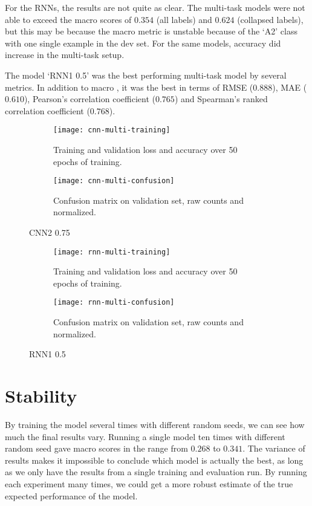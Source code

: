 For the RNNs, the results are not quite as clear. The multi-task models were
not able to exceed the macro \FI scores of $0.354$ (all labels) and $0.624$
(collapsed labels), but this may be because the macro \FI metric is unstable
because of the `A2' class with one single example in the dev set. For the
same models, accuracy did increase in the multi-task setup.

The model `RNN1 0.5' was the best performing multi-task model by several
metrics. In addition to macro \FI, it was the best in terms of RMSE
($0.888$), MAE ($0.610$), Pearson's correlation coefficient ($0.765$) and
Spearman's ranked correlation coefficient ($0.768$).


\begin{figure}
  \begin{subfigure}{\linewidth}
    \centering
    \texttt{[image: cnn-multi-training]}
    \caption{Training and validation loss and accuracy over 50 epochs of training.}
  \end{subfigure}
  \begin{subfigure}{\linewidth}
    \centering
    \texttt{[image: cnn-multi-confusion]}
    \caption{Confusion matrix on validation set, raw counts and normalized.}
  \end{subfigure}
  \caption{CNN2 0.75}
  \label{fig:cnn-multi-training}
\end{figure}

\begin{figure}
  \begin{subfigure}{\linewidth}
    \centering
    \texttt{[image: rnn-multi-training]}
    \caption{Training and validation loss and accuracy over 50 epochs of training.}
  \end{subfigure}
  \begin{subfigure}{\linewidth}
    \centering
    \texttt{[image: rnn-multi-confusion]}
    \caption{Confusion matrix on validation set, raw counts and normalized.}
  \end{subfigure}
  \caption{RNN1 0.5}
  \label{fig:rnn-multi-training}
\end{figure}


\section{Stability}

By training the model several times with different random seeds, we can see
how much the final results vary. Running a single model ten times with
different random seed gave macro \FI scores in the range from $0.268$ to
$0.341$. The variance of results makes it impossible to conclude which model
is actually the best, as long as we only have the results from a single
training and evaluation run. By running each experiment many times, we could
get a more robust estimate of the true expected performance of the model.


